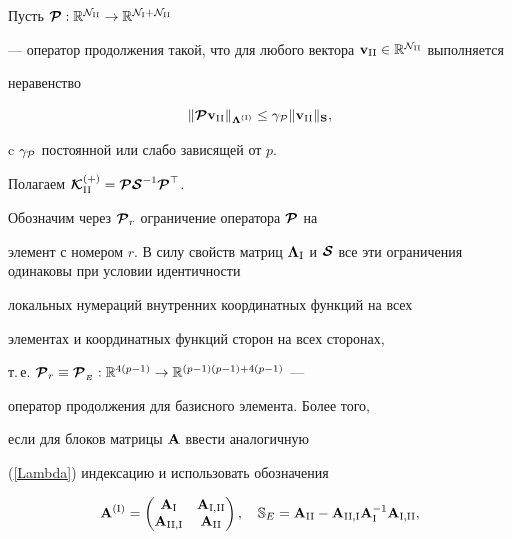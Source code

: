 Пусть $\bi {\cal P} : {\Bbb R}^{{\cal N}_{\rii}}


\rightarrow {\Bbb R}^{{\cal N}_{\ri} + {\cal N}_{\rii}}$


--- оператор продолжения такой, что для любого вектора ${\bold


v}_{\rii}\in {\Bbb R}^{{\cal N}_{\rii}}$ выполняется


неравенство


\begin{equation}\label{prolongoper}


\| \bi{\cal P} {\bold v}_{\rii} \|_{{\bi 


\Lambda}^{(\ri)}}\le\gamma_{\cal P}\|{\bold v}_{\rii} \|_{\bold S},


\end{equation}


c $\gamma_{\cal P}$ постоянной или слабо зависящей от $p$. 


Полагаем $ \bi {\cal


K}_{\rii}^{(+)} = \bi{\cal P} \bi {\cal S}^{-1} \bi {\cal P}^\top$.


Обозначим через ${\boldsymbol{\cal {P}}}_r$ ограничение оператора ${\boldsymbol{\cal {P}}}$ на


элемент с номером $r$. В силу свойств матриц ${\bi \Lambda}_\ri$ и ${\bc


S}$ все эти ограничения одинаковы при условии идентичности


локальных нумераций внутренних координатных функций на всех


элементах и координатных функций сторон на всех сторонах,


т.\,е. ${\bc P}_r\equiv {\bc P}_{_{


E}}:\Bbb {R}^{4(p-1)}\rightarrow \Bbb{R}^{(p-1)(p-1)+4(p-1)}$ --- 


оператор продолжения для базисного элемента. Более того,


если для блоков матрицы ${\bold A}$ ввести аналогичную 


(\ref{Lambda}) индексацию и использовать обозначения


\begin{equation*}%


{\bold A}^{(\ri)} = \begin{pmatrix}


{\bold A}_\ri & {\bold A}_{\ri,\rii} \\


{\bold A}_{\rii,\ri} & {\bold A}_{\rii}


\end{pmatrix}, \quad


\Bbb S_E= {\bold A}_{\rii}-{\bold A}_{\rii,\ri}{\bold


A}_\ri^{-1}{\bold A}_{\ri,\rii},


\end{equation*}


